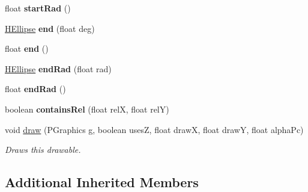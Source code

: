 \begin{DoxyCompactItemize}
\item 
\hypertarget{classhype_1_1extended_1_1drawable_1_1_h_ellipse_af8b4b0f3b999612a79f5a093b15c286e}{float {\bfseries start\-Rad} ()}\label{classhype_1_1extended_1_1drawable_1_1_h_ellipse_af8b4b0f3b999612a79f5a093b15c286e}

\item 
\hypertarget{classhype_1_1extended_1_1drawable_1_1_h_ellipse_a8a5b8ff30e6c85dcbfb563e93074bdfd}{\hyperlink{classhype_1_1extended_1_1drawable_1_1_h_ellipse}{H\-Ellipse} {\bfseries end} (float deg)}\label{classhype_1_1extended_1_1drawable_1_1_h_ellipse_a8a5b8ff30e6c85dcbfb563e93074bdfd}

\item 
\hypertarget{classhype_1_1extended_1_1drawable_1_1_h_ellipse_a091f43be1c14502912457a911c72d132}{float {\bfseries end} ()}\label{classhype_1_1extended_1_1drawable_1_1_h_ellipse_a091f43be1c14502912457a911c72d132}

\item 
\hypertarget{classhype_1_1extended_1_1drawable_1_1_h_ellipse_a0c793a1889a7dd8f74b2288aaf9dc34e}{\hyperlink{classhype_1_1extended_1_1drawable_1_1_h_ellipse}{H\-Ellipse} {\bfseries end\-Rad} (float rad)}\label{classhype_1_1extended_1_1drawable_1_1_h_ellipse_a0c793a1889a7dd8f74b2288aaf9dc34e}

\item 
\hypertarget{classhype_1_1extended_1_1drawable_1_1_h_ellipse_aed99e6cb6f4c3e73f13e47cc7611cd80}{float {\bfseries end\-Rad} ()}\label{classhype_1_1extended_1_1drawable_1_1_h_ellipse_aed99e6cb6f4c3e73f13e47cc7611cd80}

\item 
\hypertarget{classhype_1_1extended_1_1drawable_1_1_h_ellipse_a07ac294be42ea5318fe9a61aef32c274}{boolean {\bfseries contains\-Rel} (float rel\-X, float rel\-Y)}\label{classhype_1_1extended_1_1drawable_1_1_h_ellipse_a07ac294be42ea5318fe9a61aef32c274}

\item 
void \hyperlink{classhype_1_1extended_1_1drawable_1_1_h_ellipse_a3cd6745167cc6678e4625a7a7f226023}{draw} (P\-Graphics g, boolean uses\-Z, float draw\-X, float draw\-Y, float alpha\-Pc)
\begin{DoxyCompactList}\small\item\em Draws this drawable. \end{DoxyCompactList}\end{DoxyCompactItemize}
\subsection*{Additional Inherited Members}


